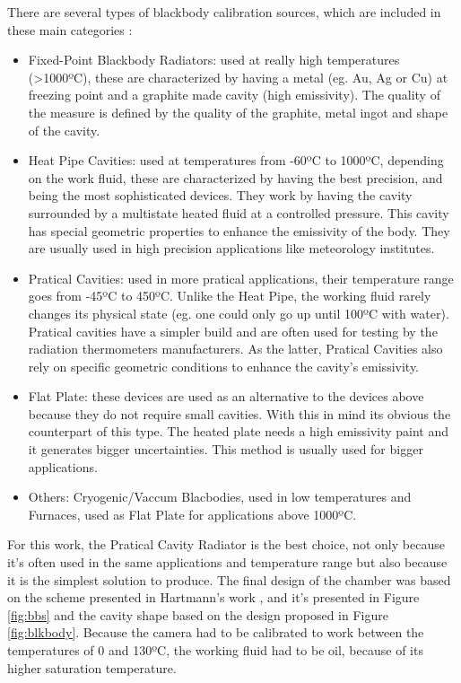 \par There are several types of blackbody calibration sources, which are included in these main categories \cite{blackbody}: 
\begin{itemize}
\item Fixed-Point Blackbody Radiators: used at really high temperatures (>1000ºC), these are characterized by having a metal (eg. Au, Ag or Cu) at freezing point and a graphite made cavity (high emissivity). The quality of the measure is defined by the quality of the graphite, metal ingot and shape of the cavity.
\item Heat Pipe Cavities: used at temperatures from -60ºC to 1000ºC, depending on the work fluid, these are characterized by having the best precision, and being the most sophisticated devices. They work by having the cavity surrounded by a multistate heated fluid at a controlled pressure. This cavity has special geometric properties to enhance the emissivity of the body. They are usually used in high precision applications like meteorology institutes.
\item Pratical Cavities: used in more pratical applications, their temperature range goes from -45ºC to 450ºC. Unlike the Heat Pipe, the working fluid rarely changes its physical state (eg. one could only go up until 100ºC with water). Pratical cavities have a simpler build and are often used for testing by the radiation thermometers manufacturers. As the latter, Pratical Cavities also rely on specific geometric conditions to enhance the cavity's emissivity.
\item Flat Plate: these devices are used as an alternative to the devices above because they do not require small cavities. With this in mind its obvious the counterpart of this type. The heated plate needs a high emissivity paint and it generates bigger uncertainties. This method is usually used for bigger applications.
\item Others: Cryogenic/Vaccum Blacbodies, used in low temperatures and Furnaces, used as Flat Plate for applications above 1000ºC.
\end{itemize}

\par For this work, the Pratical Cavity Radiator is the best choice, not only because it's often used in the same applications and temperature range but also because it is the simplest solution to produce. The final design of the chamber was based on the scheme presented in Hartmann's work \cite{blackbody}, and it's presented in Figure \ref{fig:bbs} and the cavity shape based on the design proposed in Figure \ref{fig:blkbody}. Because the camera had to be calibrated to work between the temperatures of 0 and 130ºC, the working fluid had to be oil, because of its higher saturation temperature. \\

